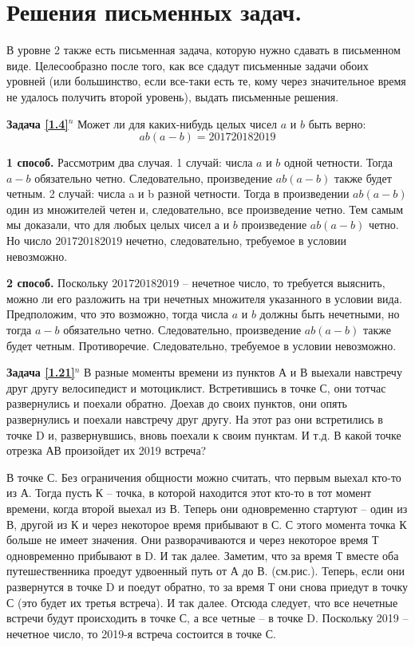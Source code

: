 
\section{ Решения письменных задач.}

В уровне 2 также есть письменная задача, которую нужно сдавать в письменном виде. Целесообразно после того, как все сдадут письменные задачи обоих уровней (или большинство, если все-таки  есть те, кому через значительное время не удалось получить второй уровень), выдать письменные решения. 



\textbf{Задача \ref{1.4}}$^n$ Может ли для каких-нибудь целых чисел $a$ и $b$ быть верно:    $$ab(a-b) = 201720182019$$

\begin{prf}
	\textbf{1 способ.} Рассмотрим два случая. 1 случай: числа $a$ и $b$ одной четности. Тогда $a - b$ обязательно четно. Следовательно, произведение $ab(a-b)$ также будет четным. 2 случай: числа a и b разной четности. Тогда в произведении $ab(a-b)$ один из множителей четен и, следовательно, все произведение четно. Тем самым мы доказали, что для любых целых чисел $ а $ и $ b $ произведение $ab(a-b)$ четно. Но число $ 201720182019 $ нечетно, следовательно, требуемое в условии невозможно.
	
	\textbf{2 способ.} Поскольку $ 201720182019 $ -- нечетное число, то требуется выяснить, можно ли его разложить на три нечетных множителя указанного в условии вида. Предположим, что это возможно, тогда числа $a$ и $b$ должны быть нечетными, но тогда $a - b$ обязательно четно. Следовательно, произведение $ab(a-b)$ также будет четным. Противоречие. Следовательно, требуемое в условии невозможно.
\end{prf}

\textbf{Задача \ref{1.21}}$^n$
	В разные моменты времени из пунктов А и В выехали навстречу друг другу велосипедист и мотоциклист. Встретившись в точке С, они тотчас развернулись и поехали обратно. Доехав до своих пунктов, они опять развернулись и поехали навстречу друг другу. На этот раз они встретились в точке D и, развернувшись, вновь поехали к своим пунктам. И т.д. В какой точке отрезка АВ произойдет их 2019 встреча?

\begin{prf}
	В точке С. 
	Без ограничения общности можно считать, что первым выехал кто-то из А. Тогда пусть К – точка, в которой находится этот кто-то в тот момент времени, когда второй выехал из В. Теперь они одновременно стартуют – один из В, другой из К и через некоторое время прибывают в С. С этого момента точка К больше не имеет значения. Они разворачиваются и через некоторое время Т одновременно прибывают в D. И так далее. Заметим, что за время Т вместе оба путешественника проедут удвоенный путь от А до В. (см.рис.). Теперь, если они развернутся в точке D и поедут обратно, то за время Т они снова приедут в точку С (это будет их третья встреча). И так далее. Отсюда следует, что все нечетные встречи будут происходить в точке С, а все четные – в точке D. Поскольку 2019 – нечетное число, то 2019-я встреча состоится в точке С.
\end{prf}

